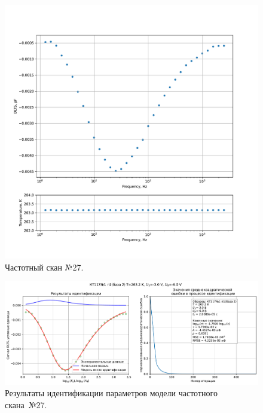 \begin{figure}[!ht]
    \centering
    \includegraphics[width=1\textwidth]{../plots/КТ117№1_п1(база 2)_2500Гц-1Гц_1пФ_-10С_-3В-6В_100мВ_20мкс_шаг_0,1.pdf}
    \caption{Частотный скан №27.}
    \label{pic:frequency_scan_27}
\end{figure}

\begin{figure}[!ht]
    \centering
    \includegraphics[width=1\textwidth]{../plots/КТ117№1_п1(база 2)_2500Гц-1Гц_1пФ_-10С_-3В-6В_100мВ_20мкс_шаг_0,1_model.pdf}
    \caption{Результаты идентификации параметров модели частотного скана~№27.}
    \label{pic:frequency_scan_model27}
\end{figure}

\pagebreak


